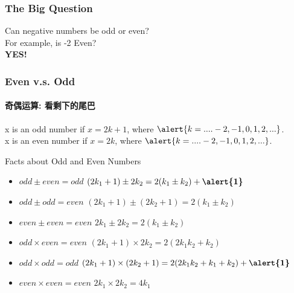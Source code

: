 \documentclass[
	11pt, %
	handout,
]{beamer}
\begin{document}

\begin{frame}
	\frametitle{The Big Question}

	{\LARGE Can negative numbers be odd or even? \\ For example, is -2 Even?\\ }
	\pause
	\bigskip
	{\LARGE \textbf{\alert{YES!}}}
\end{frame}


\begin{frame}
	\frametitle{Even v.s. Odd}
	\framesubtitle{奇偶运算: 看剩下的尾巴}
		\begin{definition}
		  x is an odd number  if $x = 2k + 1$, where $\alert{k = .... -2, -1, 0, 1, 2, ...}$.\\
		  x is an even number  if $x = 2k$, where $\alert{k = .... -2, -1, 0, 1, 2, ...}$.
	 \end{definition}
	
	\smallskip %

	\begin{block}{Facts about Odd and Even Numbers}
			\begin{itemize}
			\item $odd \pm even = odd$  \quad $(2k_1 + 1) \pm 2k_2 = 2(k_1 \pm k_2) + \textbf{\alert{1}}$
			\item $odd \pm odd = even$ \quad $(2k_1 + 1) \pm (2k_2 + 1) = 2(k_1 \pm k_2) $
			\item $even \pm even = even$ \quad $2k_1  \pm 2k_2  = 2(k_1 \pm k_2) $
		\end{itemize}
		\bigskip
		\begin{itemize}
			\item $odd \times even = even$ \quad $(2k_1 + 1) \times 2k_2  = 2(2k_1  k_2 + k_2)$
			\item $odd \times odd = odd$ \quad $(2k_1 + 1) \times (2k_2 + 1) = 2(2k_1  k_2 + k_1 + k_2) + \textbf{\alert{1}}$
			\item $even \times even = even$ \quad $2k_1 \times 2k_2  = 4k_1$
		\end{itemize}
	\end{block}
\end{frame}

\end{document}
